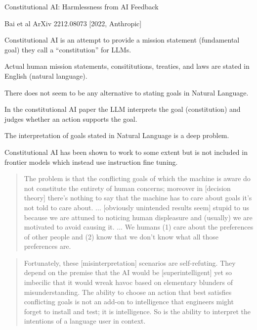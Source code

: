 {
\centerline{\huge Constitutional AI: Harmlessness from AI Feedback}
\centerline{\huge Bai et al ArXiv 2212.08073 [2022, Anthropic]}

\vfill
Constitutional AI is an attempt to provide a mission  statement (fundamental goal) they call a ``constitution'' for LLMs.

\vfill
Actual human mission statements, consititutions, treaties, and laws are stated in English (natural language).

\vfil
There does not seem to be any alternative to stating goals in Natural Language.

\vfill
In the constitutional AI paper the LLM interprets the goal (constitution) and judges whether an action supports the goal.



The interpretation of goals stated in Natural Language is a deep problem.

\vfill
Constitutional AI has been shown to work to some extent but is not included in frontier models which instead use instruction fine tuning.


\begin{quotation}
  The problem is that the conflicting goals of which the machine is aware do not constitute the entirety of human concerns; moreover in
  [decision theory] there's nothing to say that the machine has to care about goals it's not told to care about.
  ...
  [obviously unintended results seem] stupid to us because we are attuned to noticing human displeasure and (usually)
  we are motivated to avoid causing it.
  ...
  We humans (1) care about the preferences of other people and (2) know
  that we don't know what all those preferences are.
\end{quotation}


\begin{quotation}
Fortunately, these [misinterpretation] scenarios are self-refuting. They depend on the premise that
the AI would be [superintelligent] yet so imbecilic
that it would wreak havoc based on elementary blunders of misunderstanding. The ability to
choose an action that best satisfies conflicting goals is not an add-on to intelligence that
engineers might forget to install and test; it is intelligence. So is the ability to interpret the
intentions of a language user in context.
\end{quotation}

}
